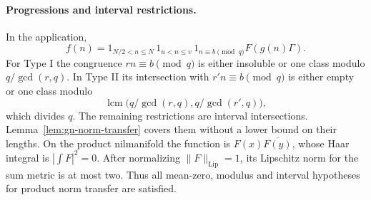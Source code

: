 \documentclass[11pt]{article}
\theoremstyle{definition}
\theoremstyle{remark}
\begin{document}
\paragraph{Progressions and interval restrictions.}\label{gi-progressions}
In the application,
\[
 f(n)=1_{N/2<n\leq N}\,1_{u<n\leq v}\,1_{n\equiv b\pmod q}
                              F(g(n)\Gamma).
\]
For Type I the congruence $rn\equiv b\pmod q$ is either insoluble or
one class modulo $q/\gcd(r,q)$.  In Type II its intersection with
$r'n\equiv b\pmod q$ is either empty or one class modulo
\[
 \operatorname{lcm}\bigl(q/\gcd(r,q),q/\gcd(r',q)\bigr),
\]
which divides $q$.  The remaining restrictions are interval intersections.
Lemma~\ref{lem:gn-norm-transfer} covers them without a lower bound on
their lengths.  On the product nilmanifold the function is
$F(x)\overline{F(y)}$, whose Haar integral is
$|\int F|^2=0$.  After normalizing $\|F\|_{\mathrm{Lip}}=1$, its
Lipschitz norm for the sum metric is at most two.  Thus all mean-zero,
modulus and interval hypotheses for product norm transfer are satisfied.
\end{document}

